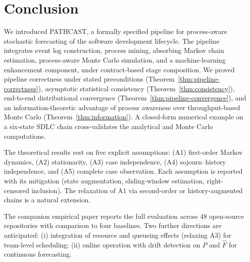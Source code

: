 
\section{Conclusion}
\label{sec:conclusion}


We introduced PATHCAST, a formally specified pipeline for process-aware
stochastic forecasting of the software development lifecycle. The
pipeline integrates event log construction, process mining, absorbing
Markov chain estimation, process-aware Monte Carlo simulation, and a
machine-learning enhancement component, under contract-based stage
composition. We proved pipeline correctness under stated preconditions
(Theorem~\ref{thm:pipeline-correctness}), asymptotic statistical
consistency (Theorem~\ref{thm:consistency}), end-to-end distributional
convergence (Theorem~\ref{thm:pipeline-convergence}), and an
information-theoretic advantage of process awareness over throughput-based
Monte Carlo (Theorem~\ref{thm:information}). A closed-form numerical
example on a six-state SDLC chain cross-validates the analytical and
Monte Carlo computations.

The theoretical results rest on five explicit assumptions:
(A1) first-order Markov dynamics, (A2) stationarity, (A3) case
independence, (A4) sojourn--history independence, and (A5) complete case
observation. Each assumption is reported with its mitigation (state
augmentation, sliding-window estimation, right-censored inclusion). The
relaxation of A1 via second-order or history-augmented chains is a
natural extension.

The companion empirical paper reports the full evaluation across 48
open-source repositories with comparison to four baselines. Two further
directions are anticipated: (i) integration of resource and queueing
effects (relaxing A3) for team-level scheduling; (ii) online operation
with drift detection on $P$ and $\hat{F}$ for continuous forecasting.

